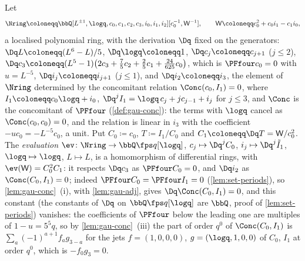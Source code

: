 \begin{defn}
\label{def:set-confexp}
Let
\[
\Nring\coloneqq\bbQ[L^{\pm1},\logq,c_0,c_1,c_2,c_3,i_0,i_1,i_2][c_0^{-1},\mathsf W^{-1}],\qquad\mathsf W\coloneqq c_0^2+c_0i_1-c_1i_0,
\]
a localised polynomial ring, with the derivation $\Dq$ fixed on the generators: $\Dq L\coloneqq(L^6-L)/5$, $\Dq\logq\coloneqq1$, $\Dq c_j\coloneqq c_{j+1}$ ($j\leq2$), $\Dq c_3\coloneqq(L^5-1)\bigl(2c_3+\frac75c_2+\frac25c_1+\frac{24}{625}c_0\bigr)$, which is $\PFfour c_0=0$ with $u=L^{-5}$, $\Dq i_j\coloneqq i_{j+1}$ ($j\leq1$), and $\Dq i_2\coloneqq i_3$, the element of $\Nring$ determined by the concomitant relation $\Conc(c_0,I_1)=0$, where $I_1\coloneqq c_0\logq+i_0$, $\Dq^jI_1=\logq\,c_j+jc_{j-1}+i_j$ for $j\leq3$, and $\Conc$ is the concomitant of $\PFfour$ (\cref{def:gau-conc}): the terms with $\logq$ cancel as $\Conc(c_0,c_0)=0$, and the relation is linear in $i_3$ with the coefficient $-uc_0=-L^{-5}c_0$, a unit. Put $C_0\coloneqq c_0$, $T\coloneqq I_1/C_0$ and $C_1\coloneqq\Dq T=\mathsf W/c_0^2$. The \emph{evaluation} $\ev\colon\Nring\to\bbQ\fps q[\logq]$, $c_j\mapsto\Dq^jC_0$, $i_j\mapsto\Dq^j\tilde I_1$, $\logq\mapsto\logq$, $L\mapsto L$, is a homomorphism of differential rings, with $\ev(\mathsf W)=C_0^2C_1$: it respects $\Dq c_3$ as $\PFfour C_0=0$, and $\Dq i_2$ as $\Conc(C_0,I_1)=0$; indeed $\PFfour C_0=\PFfour I_1=0$ (\cref{lem:set-periods}), so \cref{lem:gau-conc}~(i), with \cref{lem:gau-adj}, gives $\Dq\Conc(C_0,I_1)=0$, and this constant (the constants of $\Dq$ on $\bbQ\fps q[\logq]$ are $\bbQ$, proof of \cref{lem:set-periods}) vanishes: the coefficients of $\PFfour$ below the leading one are multiples of $1-u=5^5q$, so by \cref{lem:gau-conc}~(iii) the part of order $q^0$ of $\Conc(C_0,I_1)$ is $\sum_a(-1)^{a+1}f_ag_{3-a}$ for the jets $f=(1,0,0,0)$, $g=(\logq,1,0,0)$ of $C_0$, $I_1$ at order $q^0$, which is $-f_0g_3=0$.


\end{defn}
